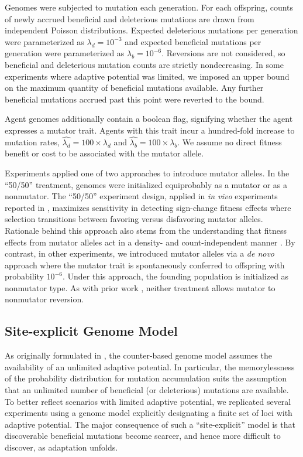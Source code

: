 Genomes were subjected to mutation each generation.
For each offspring, counts of newly accrued beneficial and deleterious mutations are drawn from independent Poisson distributions.
Expected deleterious mutations per generation were parameterized as
$\lambda_d=10^{-3}$ and expected beneficial mutations per generation were parameterized as $\lambda_b=10^{-6}$.
Reversions are not considered, so beneficial and deleterious mutation counts are strictly nondecreasing.
In some experiments where adaptive potential was limited, we imposed an upper bound on the maximum quantity of beneficial mutations available.
Any further beneficial mutations accrued past this point were reverted to the bound.

Agent genomes additionally contain a boolean flag, signifying whether the agent expresses a mutator trait.
Agents with this trait incur a hundred-fold increase to mutation rates, $\hat{\lambda_d} = 100 \times \lambda_d$ and $\hat{\lambda_b} = 100 \times \lambda_b$.
We assume no direct fitness benefit or cost to be associated with the mutator allele.

Experiments applied one of two approaches to introduce mutator alleles.
In the ``50/50'' treatment, genomes were initialized equiprobably as a mutator or as a nonmutator.
The ``50/50'' experiment design, applied in \textit{in vivo} experiments reported in \cite{raynes2018sign}, maximizes sensitivity in detecting sign-change fitness effects where selection transitions between favoring versus disfavoring mutator alleles.
Rationale behind this approach also stems from the understanding that fitness effects from mutator alleles act in a density- and count-independent manner \cite{raynes2019selection}.
By contrast, in other experiments, we introduced mutator alleles via a \textit{de novo} approach where the mutator trait is spontaneously conferred to offspring with probability $10^{-6}$.
Under this approach, the founding population is initialized as nonmutator type.
As with prior work \cite{raynes2018sign}, neither treatment allows mutator to nonmutator reversion.

\subsection{Site-explicit Genome Model} \label{sec:site-explicit}
As originally formulated in \cite{raynes2018sign}, the counter-based genome model assumes the availability of an unlimited adaptive potential.
In particular, the memorylessness of the probability distribution for mutation accumulation suits the assumption that an unlimited number of beneficial (or deleterious) mutations are available.
To better reflect scenarios with limited adaptive potential, we replicated several experiments using a genome model explicitly designating a finite set of loci with adaptive potential.
The major consequence of such a ``site-explicit'' model is that discoverable beneficial mutations become scarcer, and hence more difficult to discover, as adaptation unfolds.

